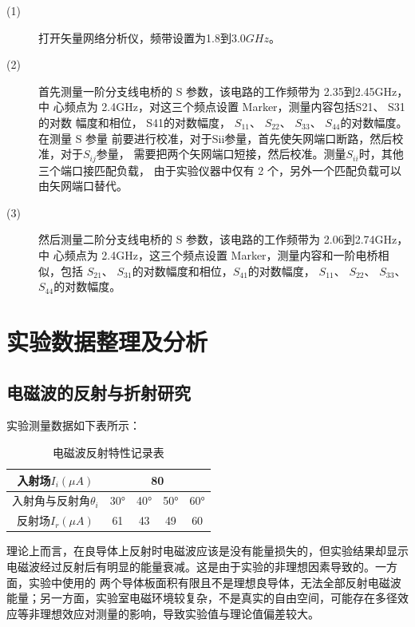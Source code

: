 \documentclass[UTF8]{ctexart}
\begin{document}
\begin{description}
    \item[(1)] 打开矢量网络分析仪，频带设置为1.8到3.0$GHz$。
    
    \item[(2)] 首先测量一阶分支线电桥的 S 参数，该电路的工作频带为 2.35到2.45GHz，中
    心频点为 2.4GHz，对这三个频点设置 Marker，测量内容包括S21、 S31的对数
    幅度和相位， S41的对数幅度， $S_{11}$、 $S_{22}$、 $S_{33}$、 $S_{44}$的对数幅度。在测量 S 参量
    前要进行校准，对于Sii参量，首先使矢网端口断路，然后校准，对于$S_{ij}$参量，
    需要把两个矢网端口短接，然后校准。测量$S_{ii}$时，其他三个端口接匹配负载，
    由于实验仪器中仅有 2 个，另外一个匹配负载可以由矢网端口替代。
    
    \item[(3)] 然后测量二阶分支线电桥的 S 参数，该电路的工作频带为 2.06到2.74GHz，中
    心频点为 2.4GHz，这三个频点设置 Marker，测量内容和一阶电桥相似，包括
    $S_{21}$、 $S_{31}$的对数幅度和相位，$S_{41}$的对数幅度， $S_{11}$、 $S_{22}$、 $S_{33}$、 $S_{44}$的对数幅度。
\end{description}


\section{实验数据整理及分析}

\subsection{电磁波的反射与折射研究}
实验测量数据如下表所示：
\begin{table}[H]
    \centering
    \renewcommand{\arraystretch}{1.5}
    \caption{电磁波反射特性记录表}
    \begin{tabular}{|c|c|c|c|c|}\hline
        入射场$I_i(\mu A)$&\multicolumn{4}{c|}{80}\\\hline
        入射角与反射角$\theta_i$&30°&40°&50°&60°\\\hline
        反射场$I_r(\mu A)$&61&43&49&60\\\hline
    \end{tabular}
\end{table}

理论上而言，在良导体上反射时电磁波应该是没有能量损失的，但实验结果却显示电磁波经过反射后有明显的能量衰减。这是由于实验的非理想因素导致的。一方面，实验中使用的
两个导体板面积有限且不是理想良导体，无法全部反射电磁波能量；另一方面，实验室电磁环境较复杂，不是真实的自由空间，可能存在多径效应等非理想效应对测量的影响，导致实验值与理论值偏差较大。
\end{document}
